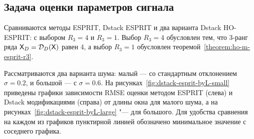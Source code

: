 \documentclass[specialist,
  substylefile=spbu_report.rtx,
subf,href,colorlinks=true, 12pt]{disser}
\theoremstyle{plain}
\theoremstyle{definition}
\theoremstyle{remark}
\begin{document}
\subsection{Задача оценки параметров сигнала}\label{subsec:dstack-esprit}
Сравниваются методы ESPRIT, Dstack ESPRIT и два варианта Dstack
HO-ESPRIT: с выбором $R_3=4$ и $R_3=1$.
Выбор $R_3=4$ обусловлен тем, что 3-ранг ряда
$\mathsf{X}_D=\mathcal{D}_D(\mathsf{X})$ равен 4, а выбор $R_3=1$ обусловлен
теоремой~\ref{theorem:ho-m-esprit-r3}.

Рассматриваются два варианта шума: малый --- со стандартным
отклонением \linebreak$\sigma=0.2$,
и большой --- с $\sigma = 0.6$.
На рисунках~\ref{fig:dstack-esprit-byL-small} приведены графики
зависимости RMSE оценки методом ESPRIT (слева) и Dstack модификациями
(справа) от длины окна для малого шума, а на
рисунках~\ref{fig:dstack-esprit-byL-large} "--- для большого.
Для удобства сравнения на каждом из графиков
пунктирной линией обозначено минимальное значение с соседнего графика.
\end{document}
